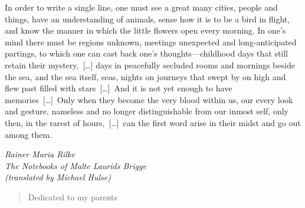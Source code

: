 
\begin{dedication} 
\setlength{\epigraphwidth}{0.63\textwidth}

\vspace*{-.25\paperheight}  
\epigraph{%
	In order to write a single line, one must see a great many cities, people and things, have an understanding of animals, sense how it is to be a bird in flight, and know the manner in which the little flowers open every morning. In one's mind there must be regions unknown, meetings unexpected and long-anticipated partings, to which one can cast back one's thoughts---childhood days that still retain their mystery,~[\dots] days in peacefully secluded rooms and mornings beside the sea, and the sea itself, seas, nights on journeys that swept by on high and flew past filled with stars~[\dots]~And it is not yet enough to have memories~[\dots]~Only when they become the very blood within us, our every look and gesture, nameless and no longer distinguishable from our inmost self, only then, in the rarest of hours,~[\dots]~can the first word arise in their midst and go out among them.}{\textit{Rainer Maria Rilke\\ The Notebooks of Malte Laurids Brigge~\\(translated by Michael Hulse)}}


\begin{quote} 
	\centering \vspace{2cm}
	\LARGE{Dedicated to my parents} 
\end{quote}



\end{dedication}

